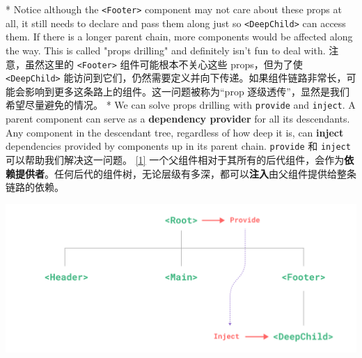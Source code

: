 \begin{paracol}{2}
\switchcolumn[0]*%
Notice although the \texttt{\textless{}Footer\textgreater{}} component
may not care about these props at all, it still needs to declare and
pass them along just so \texttt{\textless{}DeepChild\textgreater{}} can
access them. If there is a longer parent chain, more components would be
affected along the way. This is called "props drilling" and definitely
isn't fun to deal with.
\switchcolumn
注意，虽然这里的 \texttt{\textless{}Footer\textgreater{}}
组件可能根本不关心这些 props，但为了使
\texttt{\textless{}DeepChild\textgreater{}}
能访问到它们，仍然需要定义并向下传递。如果组件链路非常长，可能会影响到更多这条路上的组件。这一问题被称为``prop
逐级透传''，显然是我们希望尽量避免的情况。
\switchcolumn[0]*%
We can solve props drilling with \texttt{provide} and \texttt{inject}. A
parent component can serve as a \textbf{dependency provider} for all its
descendants. Any component in the descendant tree, regardless of how
deep it is, can \textbf{inject} dependencies provided by components up
in its parent chain.
\switchcolumn
\texttt{provide} 和 \texttt{inject} 可以帮助我们解决这一问题。
\href{https://cn.vuejs.org/guide/components/provide-inject.html\#footnote-1}{{[}1{]}}
一个父组件相对于其所有的后代组件，会作为\textbf{依赖提供者}。任何后代的组件树，无论层级有多深，都可以\textbf{注入}由父组件提供给整条链路的依赖。
\end{paracol}

\begin{center} 
\includegraphics{./img/provide-inject.3e0505e4.png} 
\end{center}

